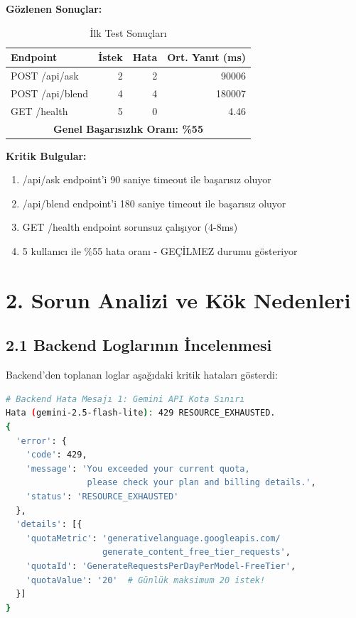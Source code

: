 \documentclass[12pt,a4paper]{report}
\begin{document}
\textbf{Gözlenen Sonuçlar:}
\begin{table}[h]
\centering
\caption{İlk Test Sonuçları}
\begin{tabular}{l|r|r|r}
\toprule
\textbf{Endpoint} & \textbf{İstek} & \textbf{Hata} & \textbf{Ort. Yanıt (ms)} \\
\midrule
POST /api/ask & 2 & 2 & 90006 \\
POST /api/blend & 4 & 4 & 180007 \\
GET /health & 5 & 0 & 4.46 \\
\midrule
\multicolumn{4}{c}{\textbf{Genel Başarısızlık Oranı: \%55}} \\
\bottomrule
\end{tabular}
\end{table}

\textbf{Kritik Bulgular:}
\begin{enumerate}
    \item /api/ask endpoint'i 90 saniye timeout ile başarısız oluyor
    \item /api/blend endpoint'i 180 saniye timeout ile başarısız oluyor
    \item GET /health endpoint sorunsuz çalışıyor (4-8ms)
    \item 5 kullanıcı ile \%55 hata oranı - GEÇİLMEZ durumu gösteriyor
\end{enumerate}

\newpage

\section{2. Sorun Analizi ve Kök Nedenleri}

\subsection{2.1 Backend Loglarının İncelenmesi}

Backend'den toplanan loglar aşağıdaki kritik hataları gösterdi:

\begin{lstlisting}[language=bash]
# Backend Hata Mesajı 1: Gemini API Kota Sınırı
Hata (gemini-2.5-flash-lite): 429 RESOURCE_EXHAUSTED.
{
  'error': {
    'code': 429,
    'message': 'You exceeded your current quota, 
                please check your plan and billing details.',
    'status': 'RESOURCE_EXHAUSTED'
  },
  'details': [{
    'quotaMetric': 'generativelanguage.googleapis.com/
                   generate_content_free_tier_requests',
    'quotaId': 'GenerateRequestsPerDayPerModel-FreeTier',
    'quotaValue': '20'  # Günlük maksimum 20 istek!
  }]
}
\end{lstlisting}
\end{document}
